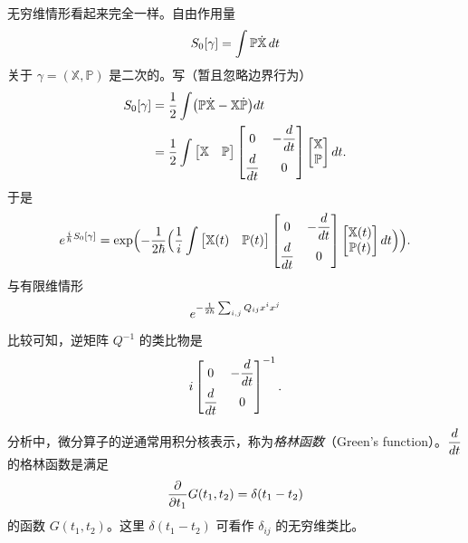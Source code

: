 无穷维情形看起来完全一样。自由作用量
\[
S_0[\gamma]=\int\mathbb P\dot{\mathbb X}\,d t
\]
关于 $\gamma=(\mathbb X,\mathbb P)$ 是二次的。写（暂且忽略边界行为）
\[
\begin{aligned}
S_0[\gamma]&=\frac12\int\bigl(\mathbb P\dot{\mathbb X}-\mathbb X\dot{\mathbb P}\bigr)d t\\
&=\frac12\int
\begin{bmatrix}\mathbb X&\mathbb P\end{bmatrix}
\begin{bmatrix}0&-\dfrac{d}{d t}\\[2mm] \dfrac{d}{d t}&0\end{bmatrix}
\begin{bmatrix}\mathbb X\\ \mathbb P\end{bmatrix}d t.
\end{aligned}
\]
于是
\[
e^{\frac{i}{\hbar}S_0[\gamma]}
=\exp\Bigl(-\frac{1}{2\hbar}\Bigl(\frac1{i}\int
\begin{bmatrix}\mathbb X(t)&\mathbb P(t)\end{bmatrix}
\begin{bmatrix}0&-\dfrac{d}{d t}\\[2mm] \dfrac{d}{d t}&0\end{bmatrix}
\begin{bmatrix}\mathbb X(t)\\ \mathbb P(t)\end{bmatrix}d t\Bigr)\Bigr).
\]
与有限维情形
\[
e^{-\frac{1}{2\hbar}\sum_{i,j}Q_{ij}x^ix^j}
\]
比较可知，逆矩阵 $Q^{-1}$ 的类比物是
\[
i\begin{bmatrix}0&-\dfrac{d}{d t}\\[2mm] \dfrac{d}{d t}&0\end{bmatrix}^{-1}.
\]

分析中，微分算子的逆通常用积分核表示，称为\emph{格林函数}（Green's function）。$\dfrac{d}{d t}$ 的格林函数是满足
\[
\frac{\partial}{\partial t_1}G(t_1,t_2)=\delta(t_1-t_2)
\]
的函数 $G(t_1,t_2)$。这里 $\delta(t_1-t_2)$ 可看作 $\delta_{ij}$ 的无穷维类比。

